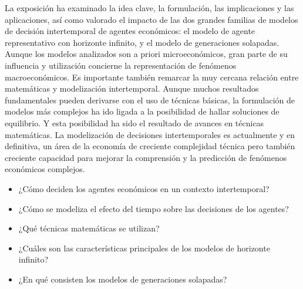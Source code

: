 \documentclass{nuevotema}
\begin{document}
La exposición ha examinado la idea clave, la formulación, las implicaciones y las aplicaciones, así como valorado el impacto de las dos grandes familias de modelos de decisión intertemporal de agentes económicos: el modelo de agente representativo con horizonte infinito, y el modelo de generaciones solapadas. Aunque los modelos analizados son a priori microeconómicos, gran parte de su influencia y utilización concierne la representación de fenómenos macroeconómicos. Es importante también remarcar la muy cercana relación entre matemáticas y modelización intertemporal. Aunque muchos resultados fundamentales pueden derivarse con el uso de técnicas básicas, la formulación de modelos más complejos ha ido ligada a la posibilidad de hallar soluciones de equilibrio. Y esta posibilidad ha sido el resultado de avances en técnicas matemáticas. La modelización de decisiones intertemporales es actualmente y en definitiva, un área de la economía de creciente complejidad técnica pero también creciente capacidad para mejorar la comprensión y la predicción de fenómenos económicos complejos.

\begin{itemize}
    \item ¿Cómo deciden los agentes económicos en un contexto intertemporal?
    \item ¿Cómo se modeliza el efecto del tiempo sobre las decisiones de los agentes?
    \item ¿Qué técnicas matemáticas se utilizan?
    \item ¿Cuáles son las características principales de los modelos de horizonte infinito?
    \item ¿En qué consisten los modelos de generaciones solapadas?
\end{itemize}

\esquemacorto
\end{document}
